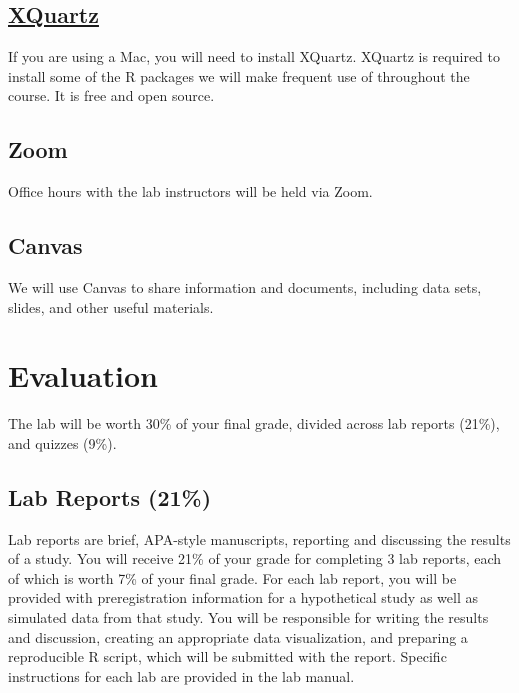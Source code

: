 \documentclass[
]{book}
\begin{document}
\hypertarget{xquartz}{%
\subsection*{\texorpdfstring{\href{https://www.xquartz.org/}{XQuartz}}{XQuartz}}\label{xquartz}}

If you are using a Mac, you will need to install XQuartz. XQuartz is required to install some of the R packages we will make frequent use of throughout the course. It is free and open source.

\hypertarget{zoom}{%
\subsection*{Zoom}\label{zoom}}

Office hours with the lab instructors will be held via Zoom.

\hypertarget{canvas}{%
\subsection*{Canvas}\label{canvas}}

We will use Canvas to share information and documents, including data sets, slides, and other useful materials.

\hypertarget{evaluation}{%
\section*{Evaluation}\label{evaluation}}

The lab will be worth 30\% of your final grade, divided across lab reports (21\%), and quizzes (9\%).

\hypertarget{lab-reports-21}{%
\subsection*{Lab Reports (21\%)}\label{lab-reports-21}}

Lab reports are brief, APA-style manuscripts, reporting and discussing the results of a study. You will receive 21\% of your grade for completing 3 lab reports, each of which is worth 7\% of your final grade. For each lab report, you will be provided with preregistration information for a hypothetical study as well as simulated data from that study. You will be responsible for writing the results and discussion, creating an appropriate data visualization, and preparing a reproducible R script, which will be submitted with the report. Specific instructions for each lab are provided in the lab manual.
\end{document}
